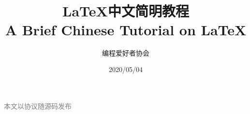 
\begin{titlepage}
	\title{\bf \LaTeX 中文简明教程 \\ A Brief Chinese Tutorial on \LaTeX}
	\author{编程爱好者协会}
	\date{2020/05/04}
	\maketitle
	\begin{center}
		\textcolor{gray}{本文以\licenseName 协议随源码发布}\\[2cm]
		\bigorglogo
	\end{center}
	\thispagestyle{empty}
	\newpage
\end{titlepage}
